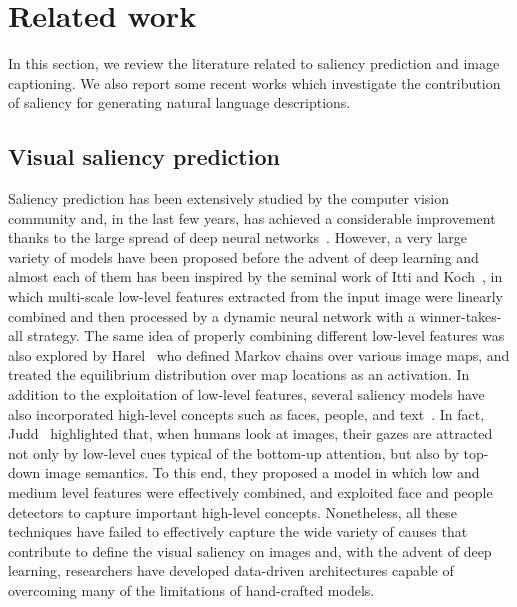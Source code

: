 \section{Related work}
In this section, we review the literature related to saliency prediction and image captioning. We also report some recent works which investigate the contribution of saliency for generating natural language descriptions.

\subsection{Visual saliency prediction}
Saliency prediction has been extensively studied by the computer vision community and, in the last few years, has achieved a considerable improvement thanks to the large spread of deep neural networks~\cite{kummerer2014deep,huang2015salicon,kruthiventi2016saliency,jetley2016end,cPan,mlnet2016,cornia2017sam}. However, a very large variety of models have been proposed before the advent of deep learning and almost each of them has been inspired by the seminal work of Itti and Koch~\cite{itti1998model}, in which multi-scale low-level features extracted from the input image were linearly combined and then processed by a dynamic neural network with a winner-takes-all strategy. The same idea of properly combining different low-level features was also explored by Harel~\etal\cite{harel2006graph} who defined Markov chains over various image maps, and treated the equilibrium distribution over map locations as an activation. In addition to the exploitation of low-level features, several saliency models have also incorporated high-level concepts such as faces, people, and text~\cite{judd2009learning,borji2012boosting,zhang2013saliency}. In fact, Judd~\etal\cite{judd2009learning} highlighted that, when humans look at images, their gazes are attracted not only by low-level cues typical of the bottom-up attention, but also by top-down image semantics. To this end, they proposed a model in which low and medium level features were effectively combined, and exploited face and people detectors to capture important high-level concepts. Nonetheless, all these techniques have failed to effectively capture the wide variety of causes that contribute to define the visual saliency on images and, with the advent of deep learning, researchers have developed data-driven architectures capable of overcoming many of the limitations of hand-crafted models. 

